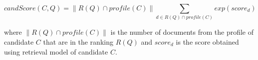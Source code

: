 \begin{table}
\centering
{}
\caption{R(Q)} \label{table:ranking}
\end{table}
\quad
\begin{table}
\centering
{}
\caption{Profiles} \label{table:profiles}
\end{table}

\begin{equation}
 candScore(C,Q) = \|R(Q) \cap profile(C)\| \sum_{d \in R(Q) \cap profile(C)} exp(score_d)
\end{equation}

where $\|R(Q) \cap profile(C)\|$ is the number of documents from the profile of candidate $C$ that are in the ranking $R(Q)$ and $score_d$ is the score
obtained using retrieval model of candidate $C$.














